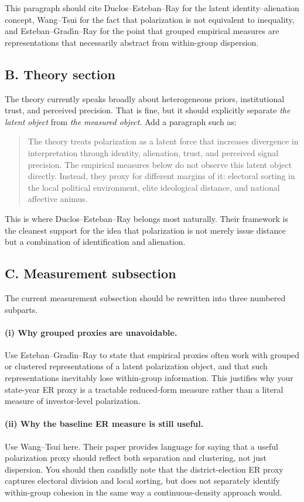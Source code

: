\documentclass[12pt]{article}
\begin{document}
This paragraph should cite Duclos--Esteban--Ray for the latent identity--alienation concept, Wang--Tsui for the fact that polarization is not equivalent to inequality, and Esteban--Grad\'{\i}n--Ray for the point that grouped empirical measures are representations that necessarily abstract from within-group dispersion.

\subsection*{B. Theory section}
The theory currently speaks broadly about heterogeneous priors, institutional trust, and perceived precision. That is fine, but it should explicitly separate \emph{the latent object} from \emph{the measured object}. Add a paragraph such as:

\begin{quote}
The theory treats polarization as a latent force that increases divergence in interpretation through identity, alienation, trust, and perceived signal precision. The empirical measures below do not observe this latent object directly. Instead, they proxy for different margins of it: electoral sorting in the local political environment, elite ideological distance, and national affective animus.
\end{quote}

This is where Duclos--Esteban--Ray belongs most naturally. Their framework is the cleanest support for the idea that polarization is not merely issue distance but a combination of identification and alienation.

\subsection*{C. Measurement subsection}
The current measurement subsection should be rewritten into three numbered subparts.

\paragraph{(i) Why grouped proxies are unavoidable.}
Use Esteban--Grad\'{\i}n--Ray to state that empirical proxies often work with grouped or clustered representations of a latent polarization object, and that such representations inevitably lose within-group information. This justifies why your state-year ER proxy is a tractable reduced-form measure rather than a literal measure of investor-level polarization.

\paragraph{(ii) Why the baseline ER measure is still useful.}
Use Wang--Tsui here. Their paper provides language for saying that a useful polarization proxy should reflect both separation and clustering, not just dispersion. You should then candidly note that the district-election ER proxy captures electoral division and local sorting, but does not separately identify within-group cohesion in the same way a continuous-density approach would.
\end{document}
